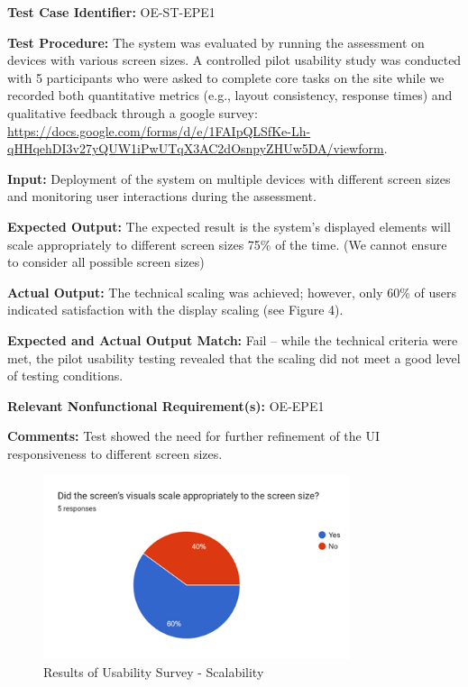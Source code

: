 \documentclass[12pt, titlepage]{article}
\begin{document}
\begin{mdframed}[linewidth=0.5mm]
  \textbf{Test Case Identifier:} OE-ST-EPE1 \par
  \textbf{Test Procedure:} The system was evaluated by running the assessment on devices with various screen sizes. A controlled pilot 
  usability study was conducted with 5 participants who were asked to complete core tasks on the site while we recorded both 
  quantitative metrics (e.g., layout consistency, response times) and qualitative feedback through a google survey: 
  \url{https://docs.google.com/forms/d/e/1FAIpQLSfKe-Lh-qHHqehDI3v27yQUW1iPwUTqX3AC2dOsnpyZHUw5DA/viewform}. \par
  \textbf{Input:} Deployment of the system on multiple devices with different screen sizes and monitoring user interactions during the assessment. \par
  \textbf{Expected Output:} The expected result is the system’s displayed elements will
  scale appropriately to different screen sizes 75\% of the time. (We cannot ensure to consider all possible screen sizes) \par
  \textbf{Actual Output:} The technical scaling was achieved; however, only 60\% of users indicated satisfaction with the display scaling (see Figure 4). \par
  \textbf{Expected and Actual Output Match:}  Fail – while the technical criteria were met, the pilot usability testing revealed that the scaling did not meet a good level of testing conditions. \par
  \textbf{Relevant Nonfunctional Requirement(s):} OE-EPE1 \par
  \textbf{Comments:} Test showed the need for further refinement of the UI responsiveness to different screen sizes. 
  \end{mdframed}

\pagebreak 

\begin{figure}[h]
  \centering
  \includegraphics[width=0.8\textwidth]{images/UsabilityTestResults2.png}
  \caption{Results of Usability Survey - Scalability}
\end{figure}
\end{document}
